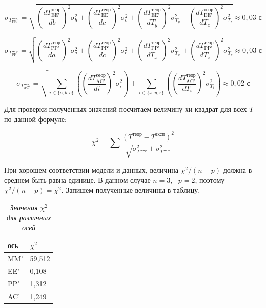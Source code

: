 \documentclass[a4paper,12pt]{article}
\begin{document}
\begin{equation}
    \sigma_{T_{\text{EE'}}^\text{теор}} = \sqrt{
    \left( \frac{dT_{\text{EE'}}^\text{теор}}{db} \right) ^ 2 \sigma_{b}^2 + 
    \left( \frac{dT_{\text{EE'}}^\text{теор}}{dc} \right) ^ 2 \sigma_{c}^2 + 
    \left( \frac{dT_{\text{EE'}}^\text{теор}}{dT_{y}} \right) ^ 2 \sigma_{T_{y}}^2 + 
    \left( \frac{dT_{\text{EE'}}^\text{теор}}{dT_{z}} \right) ^ 2 \sigma_{T_{z}}^2
    } \approx 0,03 \text{ с}
\end{equation}

\begin{equation}
    \sigma_{T_{\text{PP'}}^\text{теор}} = \sqrt{
    \left( \frac{dT_{\text{PP'}}^\text{теор}}{da} \right) ^ 2 \sigma_{a}^2 + 
    \left( \frac{dT_{\text{PP'}}^\text{теор}}{dc} \right) ^ 2 \sigma_{c}^2 + 
    \left( \frac{dT_{\text{PP'}}^\text{теор}}{dT_{x}} \right) ^ 2 \sigma_{T_{x}}^2 + 
    \left( \frac{dT_{\text{PP'}}^\text{теор}}{dT_{z}} \right) ^ 2 \sigma_{T_{z}}^2
    } \approx 0,03 \text{ с}
\end{equation}

\begin{equation}
    \sigma_{T_{\text{AC'}}^\text{теор}} = \sqrt{
    \sum_{i \in \{a, b, c\}} \left( \left( \frac{dT_{\text{AC'}}^\text{теор}}{di} \right) ^ 2 \sigma_{i}^2 \right) + 
    \sum_{i \in \{x, y, z\}} \left( \left( \frac{dT_{\text{AC'}}^\text{теор}}{dT_{i}} \right) ^ 2 \sigma_{T_{i}}^2 \right)
    } \approx 0,02 \text{ с}
\end{equation}

Для проверки полученных значений посчитаем величину хи-квадрат для всех $T$ по данной формуле:

\begin{equation}
    \chi^2 = \sum \frac{\left( T^\text{теор} - T^\text{эксп} \right)^2}{\sqrt{\sigma_{T^\text{теор}}^2 + \sigma_{T^\text{эксп}}^2}}
\end{equation}

При хорошем соответствии модели и данных, величина $\chi^2 / (n - p)$ должна в среднем быть равна единице. В данном случае $n = 3, \ \ \ p = 2$, поэтому $\chi^2 / (n - p) = \chi^2$. Запишем полученные величины в таблицу.

\begin{table}[!ht]
    \centering
    \begin{tabular}{|l|l|}
    \hline
        ось & $\chi^2$ \\ \hline
        MM' & 59,512 \\ \hline
        EE' & 0,108 \\ \hline
        PP' & 1,312 \\ \hline
        AC' & 1,249 \\ \hline
    \end{tabular}\caption{\textit{Значения $\chi^2$ для различных осей}}
\end{table}
\end{document}
